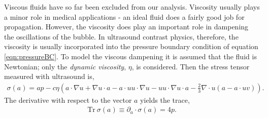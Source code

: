 \documentclass[10pt, fleqn,draft,showtrims,oldfontcommands]{article} %
\newcommand{\eqnref}[1]{\ref{eqn:#1}}
\newcommand{\lr}[1]{\left( #1 \right)}
\renewcommand{\d}{\partial}
\newcommand{\del}{\nabla}
\newcommand{\vdel}{ \mbox{\boldmath $\del$}}
\newcommand{\dr}{{\d_r}}
\newcommand{\dt}{{\d_t}}
\newcommand{\Tr}{\textrm{Tr}}
\newcommand{\scope}[1]{\tilde{#1}}
\newcommand{\vu}{\textbf{u}}
\newcommand{\vv}{\textbf{v}}
\begin{document}
Viscous fluids have so far been excluded from our analysis.
Viscosity usually plays a minor role in medical applications - 
an ideal fluid does a fairly good job for propagation.
However, the viscosity does play an important role in dampening the oscillations of the bubble.
In ultrasound contrast physics, therefore, the viscosity is usually incorporated into the pressure boundary condition of equation \eqnref{pressureBC}.
To model the viscous dampening it is assumed that the fluid is Newtonian; only the  {\em  dynamic viscosity}, $\eta$, is considered. %
Then the stress tensor measured with ultrasound is\cite{LandauBook}, 
\begin{align}
  \sigma(a) = a p - c\eta \lr{a \cdot \del u + \del u\cdot a - a\cdot u u\cdot \del u - u u \cdot \del  u\cdot a -\tfrac{2}{3}\del \cdot u \lr{a - a\cdot u v}}.\label{eqn:RelStress}
\end{align}
The derivative with respect to the vector $a$ yields the trace\cite{Hestenes1984},
\begin{align}
  \Tr\ \sigma(a) \equiv \d_a \cdot \sigma(a) = 4p. \label{eqn:RelStressTrace} 
\end{align}
\end{document}
